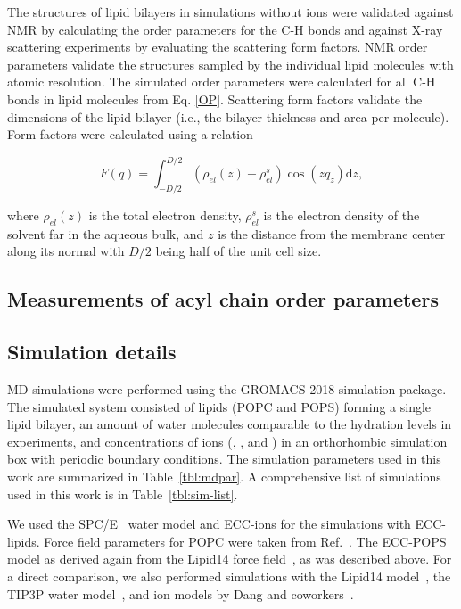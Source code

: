 \documentclass[journal=jpcbfk,manuscript=article]{achemso}
\begin{document}
The structures of lipid bilayers in simulations without ions were validated against NMR by calculating the order parameters for the C-H bonds and against \mbox{X-ray} scattering experiments by evaluating the scattering form factors. 
NMR order parameters validate the structures sampled by the individual lipid molecules with atomic resolution. 
The simulated order parameters were calculated for all C-H bonds in lipid molecules from Eq. \ref{OP}.
Scattering form factors validate the dimensions of the lipid bilayer (i.e., the bilayer thickness and area per molecule). Form factors were calculated using a relation 
 
\begin{equation} 
  F(q) = \int _{-D/2} ^{D/2} \left ( \rho_{el}(z) - \rho_{el}^s \right ) \cos (zq_z) \mathrm{d}z, 
\end{equation} 
 
\noindent where $\rho_{el} (z)$ is the total electron density, $\rho_{el}^s$ is the electron density of the solvent far in the aqueous bulk, and $z$ is the distance from the membrane center along its normal with $D/2$ being half of the unit cell size.   

\subsection{Measurements of acyl chain order parameters}
 
 
\subsection{Simulation details} 


MD simulations were performed using the GROMACS 2018 \cite{Abraham15} simulation package. 
The simulated system consisted of lipids (POPC and POPS) forming a single lipid bilayer,
an amount of water molecules comparable to the hydration levels in experiments, 
and concentrations of ions (, ,  and )
in an orthorhombic simulation box with periodic boundary conditions. 
The simulation parameters used in this work are summarized in Table~\ref{tbl:mdpar}. 
A comprehensive list of simulations used in this work is in Table~\ref{tbl:sim-list}. 

We used the SPC/E~\cite{Berendsen1987} water model 
and ECC-ions \cite{martinek17, kohagen16, Pluharova2014} 
for the simulations with ECC-lipids.
Force field parameters for POPC were taken from Ref.~. 
The ECC-POPS model as derived again from the Lipid14 force field~\cite{dickson14, lipid17-future}, as was described above.
For a direct comparison, 
we also performed simulations with the Lipid14 model~\cite{dickson14},
the TIP3P water model~\cite{jorgensen83}, 
and ion models by Dang and coworkers~\cite{smith94,chang1999,dang2006}. 
\end{document}
